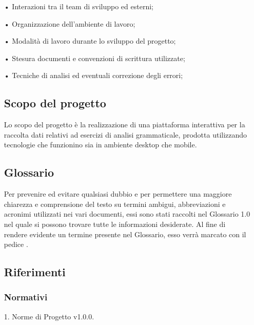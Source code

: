 \begin{itemize}
\item[•] Interazioni tra il team di sviluppo ed esterni;
\item[•] Organizzazione dell'ambiente di lavoro;
\item[•] Modalità di lavoro durante lo sviluppo del progetto;
\item[•] Stesura documenti e convenzioni di scrittura utilizzate;
\item[•] Tecniche di analisi ed eventuali correzione degli errori;	
\subsection{Scopo del progetto}
Lo scopo del progetto è la realizzazione di una piattaforma interattiva per la raccolta dati relativi ad esercizi di analisi grammaticale, prodotta utilizzando tecnologie che funzionino sia in ambiente desktop che mobile.	
\subsection{Glossario}
Per prevenire ed evitare qualsiasi dubbio e per permettere una maggiore chiarezza e comprensione del testo su termini ambigui, abbreviazioni e acronimi utilizzati nei vari documenti, essi sono stati raccolti nel Glossario 1.0 nel quale si possono trovare tutte le informazioni desiderate.
Al fine di rendere evidente un termine presente nel Glossario, esso verrà marcato con il pedice .
\subsection{Riferimenti}

\subsubsection{Normativi}
1. Norme di Progetto v1.0.0.
	

\end{itemize}
